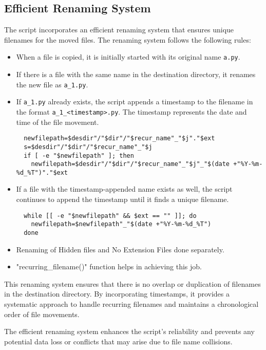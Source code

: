 \documentclass{article}
\begin{document}
\subsection{Efficient Renaming System}

The script incorporates an efficient renaming system that ensures unique filenames for the moved files. The renaming system follows the following rules:

\begin{itemize}
  \item When a file is copied, it is initially started with its original name \texttt{a.py}.
  \item If there is a file with the same name in the destination directory, it renames the new file as \texttt{a\_1.py}.
  \item If \texttt{a\_1.py} already exists, the script appends a timestamp to the filename in the format \texttt{a\_1\_<timestamp>.py}. The timestamp represents the date and time of the file movement.
  \begin{verbatim}
  newfilepath=$desdir"/"$dir"/"$recur_name"_"$j"."$ext
  s=$desdir"/"$dir"/"$recur_name"_"$j
  if [ -e "$newfilepath" ]; then
    newfilepath=$desdir"/"$dir"/"$recur_name"_"$j"_"$(date +"%Y-%m-%d_%T")"."$ext
  \end{verbatim}
  \item If a file with the timestamp-appended name exists as well, the script continues to append the timestamp until it finds a unique filename.
  \begin{verbatim}
  while [[ -e "$newfilepath" && $ext == "" ]]; do
    newfilepath=$newfilepath"_"$(date +"%Y-%m-%d_%T")
  done
  \end{verbatim}
  \item Renaming of Hidden files and No Extension Files done separately.
  \item "recurring\_filename()" function helps in achieving this job.
\end{itemize}


This renaming system ensures that there is no overlap or duplication of filenames in the destination directory. By incorporating timestamps, it provides a systematic approach to handle recurring filenames and maintains a chronological order of file movements.

The efficient renaming system enhances the script's reliability and prevents any potential data loss or conflicts that may arise due to file name collisions.
\end{document}
